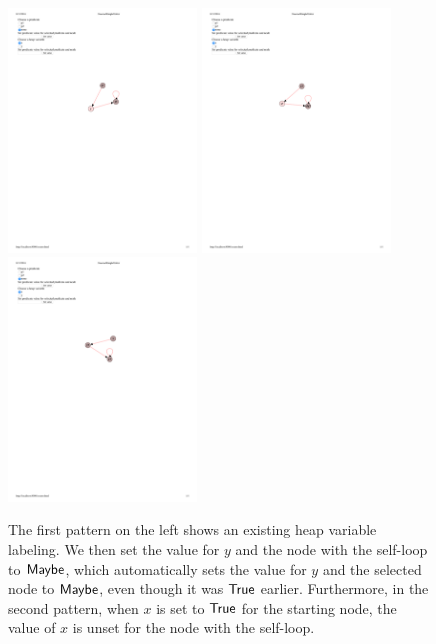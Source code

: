 \begin{figure}
  \centering
  \includegraphics[width=5cm]{fig/heap-var-labeling.pdf}
  \includegraphics[width=5cm]{fig/heap-var-labeling-2.pdf}
  \includegraphics[width=5cm]{fig/heap-var-labeling-3.pdf}
  \caption{The first pattern on the left shows an existing heap variable labeling. We then set the value for $y$ and the node with the self-loop to $\mathsf{Maybe}$, which automatically sets the value for $y$ and the selected node to $\mathsf{Maybe}$, even though it was $\mathsf{True}$ earlier. Furthermore, in the second pattern, when $x$ is set to $\mathsf{True}$ for the starting node, the value of $x$ is unset for the node with the self-loop.
  }
  \label{fig:modifying-heap-vars}
\end{figure}

